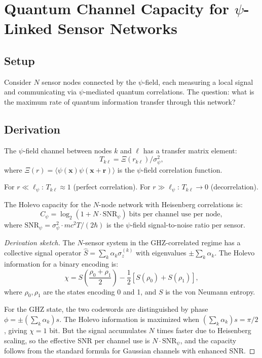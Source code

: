 \documentclass[11pt]{article}
\theoremstyle{definition}
\theoremstyle{remark}
\begin{document}
\section{Quantum Channel Capacity for $\psi$-Linked Sensor Networks}
\label{sec:channel-capacity}

\subsection{Setup}

Consider $N$ sensor nodes connected by the $\psi$-field, each measuring
a local signal and communicating via $\psi$-mediated quantum
correlations. The question: what is the maximum rate of quantum
information transfer through this network?

\subsection{Derivation}

The $\psi$-field channel between nodes $k$ and $\ell$ has a transfer
matrix element:
\begin{equation}
T_{k\ell} = \Xi(r_{k\ell}) / \sigma_\psi^2,
\end{equation}
where $\Xi(r) = \langle\psi(\mathbf{x})\psi(\mathbf{x}+\mathbf{r})\rangle$
is the $\psi$-field correlation function.

For $r \ll \ell_\psi$: $T_{k\ell} \approx 1$ (perfect correlation).
For $r \gg \ell_\psi$: $T_{k\ell} \to 0$ (decorrelation).

The Holevo capacity for the $N$-node network with Heisenberg correlations is:
\begin{equation}
\boxed{C_\psi = \log_2\!\left(1 + N \cdot \mathrm{SNR}_\psi\right)
\;\text{bits per channel use per node}},
\end{equation}
where $\mathrm{SNR}_\psi = \sigma_\psi^2 \cdot mc^2 T / (2\hbar)$ is
the $\psi$-field signal-to-noise ratio per sensor.

\begin{proof}[Derivation sketch]
The $N$-sensor system in the GHZ-correlated regime has a collective
signal operator $\hat{S} = \sum_k \alpha_k \sigma_z^{(k)}$ with
eigenvalues $\pm \sum_k \alpha_k$. The Holevo information for a binary
encoding is:
\begin{equation}
\chi = S\!\left(\frac{\rho_0 + \rho_1}{2}\right)
- \frac{1}{2}[S(\rho_0) + S(\rho_1)],
\end{equation}
where $\rho_0, \rho_1$ are the states encoding 0 and 1, and $S$ is the
von Neumann entropy.

For the GHZ state, the two codewords are distinguished by phase
$\phi = \pm (\sum_k \alpha_k) s$. The Holevo information is maximized
when $(\sum_k \alpha_k)s = \pi/2$, giving $\chi = 1$ bit. But the
signal accumulates $N$ times faster due to Heisenberg scaling, so the
effective SNR per channel use is $N \cdot \mathrm{SNR}_\psi$, and the
capacity follows from the standard formula for Gaussian channels with
enhanced SNR.
\end{proof}
\end{document}
